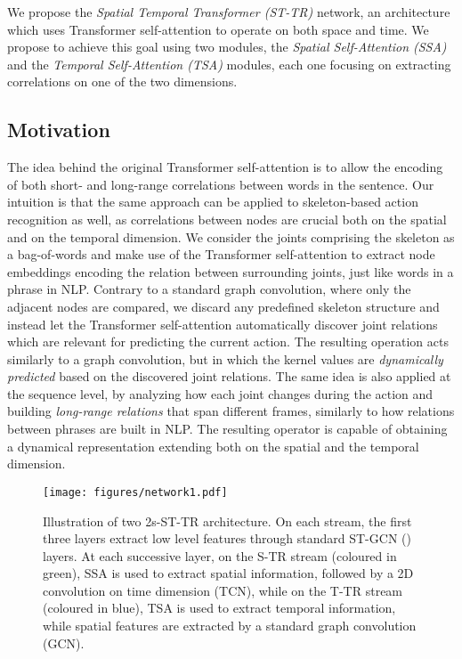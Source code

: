\documentclass[times,twocolumn,final,authoryear]{elsarticle}
\begin{document}
We propose the \textit{Spatial Temporal Transformer (ST-TR)} network, an architecture which uses Transformer self-attention to operate on both space and time. We propose to achieve this goal using two modules, the \textit{Spatial Self-Attention (SSA)} and the \textit{Temporal Self-Attention (TSA)} modules, each one focusing on extracting correlations on one of the two dimensions. 



\subsection{Motivation}
The idea behind the original Transformer self-attention is to allow the encoding of both short- and long-range correlations between words in the sentence. Our intuition is that the same approach can be applied to skeleton-based action recognition as well, as correlations between nodes are crucial both on the spatial and on the temporal dimension. 
We consider the joints comprising the skeleton as a bag-of-words and make use of the Transformer self-attention to extract node embeddings encoding the relation between surrounding joints, just like words in a phrase in NLP. Contrary to a standard graph convolution, where only the adjacent nodes are compared, we discard any predefined skeleton structure and instead let the Transformer self-attention automatically discover joint relations which are relevant for predicting the current action. The resulting operation acts similarly to a graph convolution, but in which the kernel values are \textit{dynamically predicted} based on the discovered joint relations. The same idea is also applied at the sequence level, by analyzing how each joint changes during the action and building \textit{long-range relations} that span different frames, similarly to how relations between phrases are built in NLP. The resulting operator is capable of obtaining a dynamical representation extending both on the spatial and the temporal dimension. 





 
 \begin{figure}
    \centering
    \texttt{[image: figures/network1.pdf]}
    \caption{Illustration of two 2s-ST-TR architecture. On each stream, the first three layers extract low level features through standard ST-GCN (\cite{yan2018spatial}) layers. At each successive layer, on the S-TR stream (coloured in \textcolor{ssa_green}{green}), SSA is used to extract spatial information, followed by a 2D convolution on time dimension (TCN), while on the T-TR stream  (coloured in \textcolor{tsa_blue}{blue}), TSA is used to extract temporal information, while spatial features are extracted by a standard graph convolution (GCN).}
    \label{architecture}
\end{figure}
\end{document}
